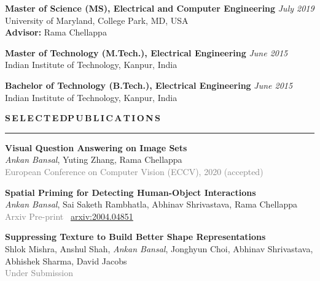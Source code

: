 \documentclass[11pt, a4paper]{article}
\begin{document}
\vspace{3pt}

\textbf{Master of Science (MS), Electrical and Computer Engineering} \hfill  \textit{July 2019} \\
University of Maryland, College Park, MD, USA \\
\textbf{Advisor: }Rama Chellappa

\vspace{3pt}

\textbf{Master of Technology (M.Tech.), Electrical Engineering} \hfill  \textit{June 2015} \\
Indian Institute of Technology, Kanpur, India

\vspace{3pt}

\textbf{Bachelor of Technology (B.Tech.), Electrical Engineering} \hfill  \textit{June 2015} \\
Indian Institute of Technology, Kanpur, India

\vspace{5pt}


\textbf{S\,E\,L\,E\,C\,T\,E\,D{\hspace{0.6em}}P\,U\,B\,L\,I\,C\,A\,T\,I\,O\,N\,S}
\vspace{5pt}
\hrule
\vspace{7pt}

\textbf{Visual Question Answering on Image Sets}\\
\textit{Ankan Bansal}, Yuting Zhang, Rama Chellappa\\
\textcolor{gray}{European Conference on Computer Vision (ECCV), 2020 (accepted)}

\vspace{4pt}

\textbf{Spatial Priming for Detecting Human-Object Interactions}\\
\textit{Ankan Bansal}, Sai Saketh Rambhatla, Abhinav Shrivastava, Rama Chellappa\\
\textcolor{gray}{Arxiv Pre-print} ~\href{https://arxiv.org/abs/2004.04851}{arxiv:2004.04851}

\vspace{4pt}

\textbf{Suppressing Texture to Build Better Shape Representations}\\
Shlok Mishra, Anshul Shah, \textit{Ankan Bansal}, Jonghyun Choi, Abhinav Shrivastava, Abhishek
Sharma, David Jacobs\\
\textcolor{gray}{Under Submission}
\end{document}
